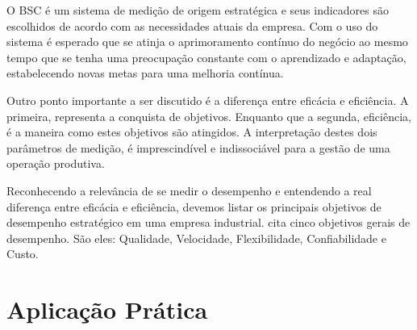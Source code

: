 O BSC é um sistema de medição de origem estratégica e seus indicadores são escolhidos de acordo com as necessidades atuais da empresa. Com o uso do sistema é esperado que se atinja o aprimoramento contínuo do negócio ao mesmo tempo que se tenha uma preocupação constante com o aprendizado e adaptação, estabelecendo novas metas para uma melhoria contínua.

Outro ponto importante a ser discutido é a diferença entre eficácia e eficiência. A primeira, representa a conquista de objetivos. Enquanto que a segunda, eficiência, é a maneira como estes objetivos são atingidos. A interpretação destes dois parâmetros de medição, é imprescindível e indissociável para a gestão de uma operação produtiva.

Reconhecendo a relevância de se medir o desempenho e entendendo a real diferença entre eficácia e eficiência, devemos listar os principais objetivos de desempenho estratégico em uma empresa industrial. %
\cite{slack2006administracao} cita cinco objetivos gerais de desempenho. São eles: Qualidade, Velocidade, Flexibilidade, Confiabilidade e Custo.

\section{Aplicação Prática}
\label{sec:estrategia_da_producao_aplicacao}
